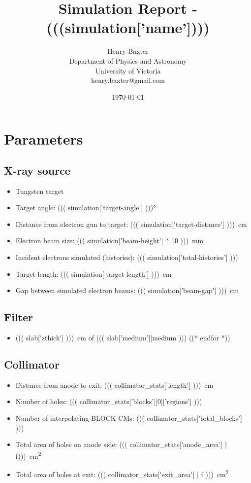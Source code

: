 \documentclass[12pt]{article}
\title{Simulation Report - (((simulation['name'])))}
\author{
        Henry Baxter \\
                Department of Physics and Astronomy\\
        University of Victoria\\
        henry.baxter@gmail.com
}
\date{\today}
\begin{document}
\maketitle

\tableofcontents

\section{Parameters}

\subsection{X-ray source}
\begin{itemize}
	\item Tungsten target
	\item Target angle: \ang{((( simulation['target-angle'] )))}
	\item Distance from electron gun to target: \SI{((( simulation['target-distance'] )))}{\cm}
	\item Electron beam size: \SI{((( simulation['beam-height'] * 10 )))}{\mm}
	\item Incident electrons simulated (histories): ((( simulation['total-histories'] )))
	\item Target length: \SI{((( simulation['target-length'] )))}{\cm}
	\item Gap between simulated electron beams: \SI{((( simulation['beam-gap'] )))}{\cm}
\end{itemize}

\subsection{Filter}
\begin{itemize}
	((* for slab in templates['filter']['cms'][0]['slabs'] *))
	\item \SI{((( slab['zthick'] )))}{\cm} of ((( slab['medium']|medium )))
	((* endfor *))
\end{itemize}

\subsection{Collimator}
\begin{itemize}
	\item Distance from anode to exit: \SI{((( collimator_stats['length'] )))}{\cm}
	\item Number of holes: ((( collimator_stats['blocks'][0]['regions'] )))
	\item Number of interpolating BLOCK CMs: ((( collimator_stats['total_blocks'] )))
	\item Total area of holes on anode side: \SI{((( collimator_stats['anode_area'] | f)))}{\cm\squared}
	\item Total area of holes at exit: \SI{((( collimator_stats['exit_area'] | f )))}{\cm\squared}
\end{itemize}
\end{document}
